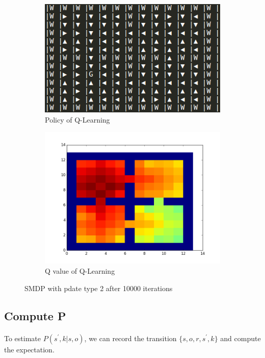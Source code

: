 \documentclass[]{article}
\begin{document}
\begin{figure}
	\centering
	\begin{subfigure}[b]{0.475\textwidth}
		\includegraphics[width=\linewidth]{update_2_policy2.png}
		\caption{Policy of Q-Learning}
	\end{subfigure}
	\begin{subfigure}[b]{0.475\textwidth}
		\centering
		\includegraphics[width=.9\linewidth]{update_2_value_plot2.png}
		\caption{Q value of Q-Learning}
	\end{subfigure}
	\caption{SMDP with pdate type 2 after 10000 iterations}
\end{figure}

\subsection{Compute P}
\paragraph{}To estimate $P(s^{'},k|s,o)$, we can record the transition $\{s,o,r,s^{'},k\}$ and compute the expectation.
\end{document}
